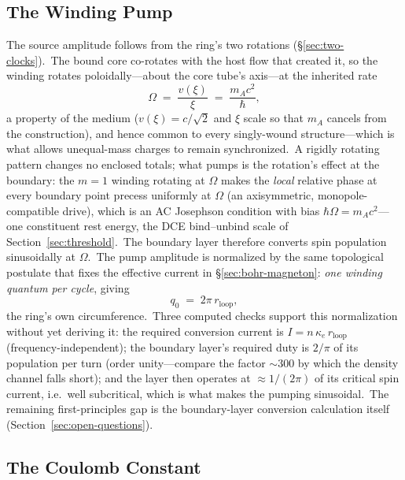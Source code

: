 \documentclass[12pt,letterpaper]{article}
\newcommand{\rloop}{r_{\mathrm{loop}}}
\begin{document}
\subsection{The Winding Pump}
\label{sec:winding-pump}

The source amplitude follows from the ring's two rotations
(§\ref{sec:two-clocks}).\ The bound core co-rotates with the host flow
that created it, so the winding rotates poloidally---about the core
tube's axis---at the inherited rate
%
\begin{equation}
  \Omega \;=\; \frac{v(\xi)}{\xi} \;=\; \frac{m_A c^2}{\hbar},
  \label{eq:pump-clock}
\end{equation}
%
a property of the medium ($v(\xi) = c/\sqrt{2}$ and $\xi$ scale so that
$m_A$ cancels from the construction), and hence common to every
singly-wound structure---which is what allows unequal-mass charges to
remain synchronized.\ A rigidly rotating pattern changes no enclosed
totals; what pumps is the rotation's effect at the boundary: the $m = 1$
winding rotating at $\Omega$ makes the \emph{local} relative phase at
every boundary point precess uniformly at $\Omega$ (an axisymmetric,
monopole-compatible drive), which is an AC Josephson condition with bias
$\hbar\Omega = m_A c^2$---one constituent rest energy, the DCE
bind--unbind scale of Section~\ref{sec:threshold}.\ The boundary layer
therefore converts spin population sinusoidally at $\Omega$.\ The pump
amplitude is normalized by the same topological postulate that fixes the
effective current in §\ref{sec:bohr-magneton}: \emph{one winding quantum
per cycle}, giving
%
\begin{equation}
  q_0 \;=\; 2\pi\,\rloop,
  \label{eq:q0}
\end{equation}
%
the ring's own circumference.\ Three computed checks support this
normalization without yet deriving it: the required conversion current
is $I = n\,\kappa_e\,\rloop$ (frequency-independent); the boundary
layer's required duty is $2/\pi$ of its population per turn (order
unity---compare the factor $\sim\!300$ by which the density channel
falls short); and the layer then operates at $\approx 1/(2\pi)$ of its
critical spin current, i.e.\ well subcritical, which is what makes the
pumping sinusoidal.\ The remaining first-principles gap is the
boundary-layer conversion calculation itself
(Section~\ref{sec:open-questions}).

\subsection{The Coulomb Constant}
\label{sec:k-result}
\end{document}
